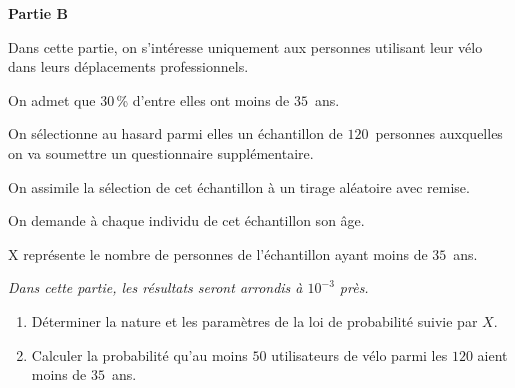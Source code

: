 \bigskip

\textbf{Partie B}

\medskip

Dans cette partie, on s'intéresse uniquement aux personnes utilisant leur vélo dans leurs déplacements professionnels.

\medskip

On admet que 30\,\% d'entre elles ont moins de $35$~ans.

On sélectionne au hasard parmi elles un échantillon de $120$~personnes auxquelles on va soumettre un questionnaire supplémentaire. 

On assimile la sélection de cet échantillon à un tirage aléatoire avec remise.

\medskip

On demande à chaque individu de cet échantillon son âge.

\medskip

X représente le nombre de personnes de l'échantillon ayant moins de $35$~ans.

\medskip

\emph{Dans cette partie, les résultats seront arrondis à $10^{-3}$ près.}

\medskip

\begin{enumerate}
\item Déterminer la nature et les paramètres de la loi de probabilité suivie par $X$.
\item Calculer la probabilité qu'au moins $50$ utilisateurs de vélo parmi les $120$ aient moins de $35$~ans.
\end{enumerate}

\bigskip
